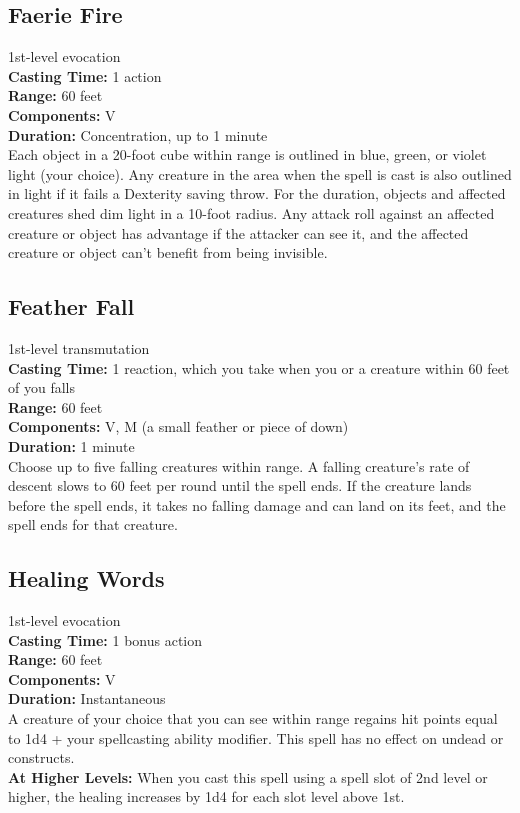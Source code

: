\documentclass[11pt, A4paper, english]{article}
\begin{document}
		\subsection{Faerie Fire}
1st-level evocation \\
\textbf{Casting Time:} 1 action \\
\textbf{Range:} 60 feet \\
\textbf{Components:} V \\
\textbf{Duration:} Concentration, up to 1 minute \\
Each object in a 20-foot cube within range is outlined in blue, green, or violet light (your choice). Any creature in the area when the spell is cast is also outlined in light if it fails a Dexterity saving throw. For the duration, objects and affected creatures shed dim light in a 10-foot radius. Any attack roll against an affected creature or object has advantage if the attacker can see it, and the affected creature or object can’t benefit from being invisible.

		\subsection{Feather Fall}
1st-level transmutation \\
\textbf{Casting Time:} 1 reaction, which you take when you or a creature within 60 feet of you falls \\
\textbf{Range:} 60 feet \\
\textbf{Components:} V, M (a small feather or piece of down) \\
\textbf{Duration:} 1 minute \\
Choose up to five falling creatures within range. A falling creature's rate of descent slows to 60 feet per round until the spell ends. If the creature lands before the spell ends, it takes no falling damage and can land on its feet, and the spell ends for that creature.

		\subsection{Healing Words}
1st-level evocation \\
\textbf{Casting Time:} 1 bonus action \\
\textbf{Range:} 60 feet \\
\textbf{Components:} V \\
\textbf{Duration:} Instantaneous \\
A creature of your choice that you can see within range regains hit points equal to 1d4 + your spellcasting ability modifier. This spell has no effect on undead or constructs. \\
\textbf{At Higher Levels:} When you cast this spell using a spell slot of 2nd level or higher, the healing increases by 1d4 for each slot level above 1st.
\end{document}
